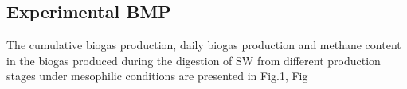 \subsection{Experimental BMP}
The cumulative biogas production, daily biogas production and methane content in the biogas produced during the digestion of SW from different production stages under mesophilic conditions are presented in Fig.1, Fig